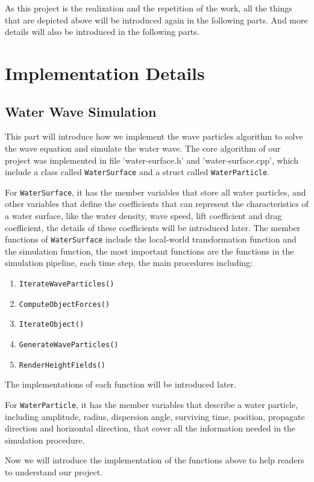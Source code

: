 \documentclass[acmtog]{acmart}
\begin{document}
As this project is the realization and the repetition of the work, all the things that are depicted above will be introduced again in the following parts. 
And more details will also be introduced in the following parts. 

\section{Implementation Details}
\subsection{Water Wave Simulation}
This part will introduce how we implement the wave particles algorithm to solve the wave equation and simulate the water wave.
The core algorithm of our project was implemented in file 'water-surface.h' and 'water-surface.cpp', which include a class called \verb|WaterSurface| and a struct called \verb|WaterParticle|.

For \verb|WaterSurface|, it has the member variables that store all water particles, and other variables that define the coefficients that can represent the characteristics of a water surface, like the water density, wave speed, lift coefficient and drag coefficient, the details of these coefficients will be introduced later.
The member functions of \verb|WaterSurface| include the local-world transformation function and the simulation function, the most important functions are the functions in the simulation pipeline, each time step, the main procedures including:
\begin{enumerate}
    \item \verb|IterateWaveParticles()| 
    \item \verb|ComputeObjectForces()| 
    \item \verb|IterateObject()| 
    \item \verb|GenerateWaveParticles()| 
    \item \verb|RenderHeightFields()|
\end{enumerate}
The implementations of each function will be introduced later. 

For \verb|WaterParticle|, it has the member variables that describe a water particle, including amplitude, radius, dispersion angle, surviving time, position, propagate direction and horizontal direction, that cover all the information needed in the simulation procedure.

Now we will introduce the implementation of the functions above to help readers to understand our project.
\end{document}
